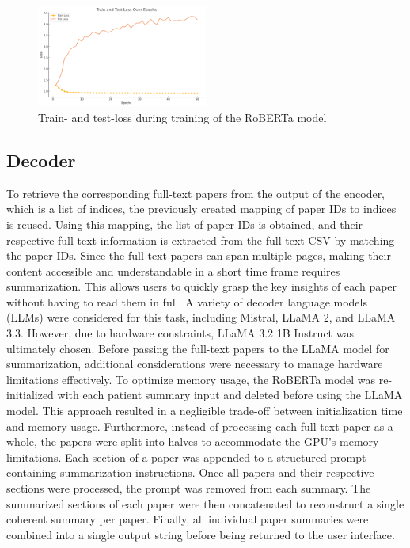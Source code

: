 \begin{figure}[hbt!]
    \centering
    \includegraphics[width=0.5\textwidth]{Fig/loss.png}
    \caption{Train- and test-loss during training of the RoBERTa model}
    \label{fig:loss}
\end{figure}\noindent 

\subsection{Decoder}
To retrieve the corresponding full-text papers from the output of the encoder, which is a list of indices, the previously created mapping of paper IDs to indices is reused. Using this mapping, the list of paper IDs is obtained, and their respective full-text information is extracted from the full-text CSV by matching the paper IDs.
Since the full-text papers can span multiple pages, making their content accessible and understandable in a short time frame requires summarization. This allows users to quickly grasp the key insights of each paper without having to read them in full.
A variety of decoder language models (LLMs) were considered for this task, including Mistral, LLaMA 2, and LLaMA 3.3. However, due to hardware constraints, LLaMA 3.2 1B Instruct was ultimately chosen. Before passing the full-text papers to the LLaMA model for summarization, additional considerations were necessary to manage hardware limitations effectively.
To optimize memory usage, the RoBERTa model was re-initialized with each patient summary input and deleted before using the LLaMA model. This approach resulted in a negligible trade-off between initialization time and memory usage. Furthermore, instead of processing each full-text paper as a whole, the papers were split into halves to accommodate the GPU's memory limitations.
Each section of a paper was appended to a structured prompt containing summarization instructions. Once all papers and their respective sections were processed, the prompt was removed from each summary. The summarized sections of each paper were then concatenated to reconstruct a single coherent summary per paper. Finally, all individual paper summaries were combined into a single output string before being returned to the user interface.

